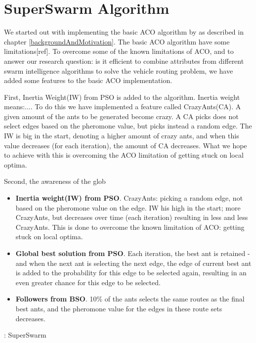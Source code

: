 \section{SuperSwarm Algorithm}

We started out with implementing the basic ACO algorithm by \citet{nanda11} as described in chapter \ref{backgroundAndMotivation}. The basic ACO algorithm have some limitations[ref]. To overcome some of the known limitations of ACO, and to answer our research question: is it efficient to combine attributes from different swarm intelligence algorithms to solve the vehicle routing problem, we have added some features to the basic ACO implementation.

First, Inertia Weight(IW) from PSO is added to the algorithm. Inertia weight means:.... To do this we have implemented a feature called CrazyAnts(CA). A given amount of the ants to be generated become crazy. A CA picks does not select edges based on the pheromone value, but picks instead a random edge. The IW is big in the start, denoting a higher amount of crazy ants, and when this value decreases (for each iteration), the amount of CA decreases. What we hope to achieve with this is overcoming the ACO limitation of getting stuck on local optima.

Second, the awareness of the glob

\begin{itemize}
\item \textbf{Inertia weight(IW) from PSO}. CrazyAnts: picking a random edge, not based on the pheromone value on the edge. IW his high in the start; more CrazyAnts, but decreases over time (each iteration) resulting in less and less CrazyAnts. This is done to overcome the known limitation of ACO: getting stuck on local optima.
\item \textbf{Global best solution from PSO}. Each iteration, the best ant is retained - and when the next ant is selecting the next edge, the edge of current best ant is added to the probability for this edge to be selected again, resulting in an even greater chance for this edge to be selected.
\item \textbf{Followers from BSO}. 10\% of the ants selects the same routes as the final best ants, and the pheromone value for the edges in these route sets decreases.
\end{itemize}

: SuperSwarm



